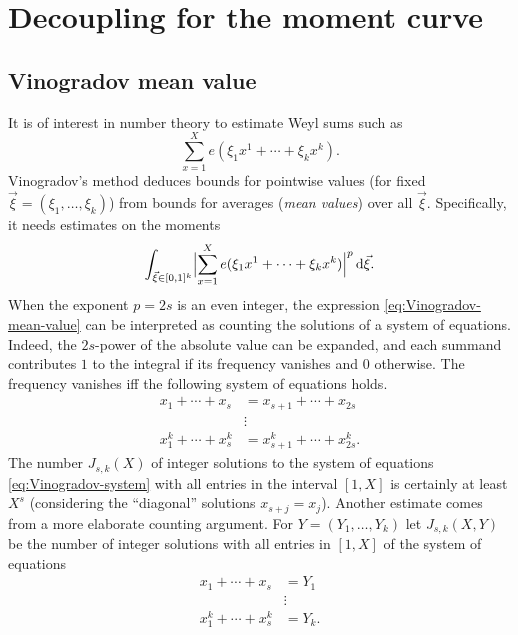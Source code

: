 \section{Decoupling for the moment curve}

\subsection{Vinogradov mean value}
It is of interest in number theory to estimate Weyl sums such as
\[
\sum_{x=1}^{X} e(\xi_{1} x^{1} + \dotsb + \xi_{k}x^{k} ).
\]
Vinogradov's method deduces bounds for pointwise values (for fixed $\vec\xi = (\xi_{1},\dotsc,\xi_{k})$) from bounds for averages (\emph{mean values}) over all $\vec\xi$.
Specifically, it needs estimates on the moments
\begin{equation}
\label{eq:Vinogradov-mean-value}
\int_{\vec\xi \in [0,1]^{k}} \abs[\Big]{ \sum_{x=1}^{X} e(\xi_{1} x^{1} + \dotsb + \xi_{k}x^{k} ) }^{p} \dif\vec\xi.
\end{equation}
When the exponent $p=2s$ is an even integer, the expression \eqref{eq:Vinogradov-mean-value} can be interpreted as counting the solutions of a system of equations.
Indeed, the $2s$-power of the absolute value can be expanded, and each summand contributes $1$ to the integral if its frequency vanishes and $0$ otherwise.
The frequency vanishes iff the following system of equations holds.
\begin{equation}
\label{eq:Vinogradov-system}
\begin{split}
x_{1} + \dotsb + x_{s} &= x_{s+1} + \dotsb + x_{2s} \\
& \vdots \\
x_{1}^{k} + \dotsb + x_{s}^{k} &= x_{s+1}^{k} + \dotsb + x_{2s}^{k}.
\end{split}
\end{equation}
The number $J_{s,k}(X)$ of integer solutions to the system of equations \eqref{eq:Vinogradov-system} with all entries in the interval $[1,X]$ is certainly at least $X^{s}$ (considering the ``diagonal'' solutions $x_{s+j}=x_{j}$).
Another estimate comes from a more elaborate counting argument.
For $Y=(Y_{1},\dotsc,Y_{k})$ let $J_{s,k}(X,Y)$ be the number of integer solutions with all entries in $[1,X]$ of the system of equations
\begin{align*}
x_{1} + \dotsb + x_{s} &= Y_{1} \\
& \vdots \\
x_{1}^{k} + \dotsb + x_{s}^{k} &= Y_{k}.
\end{align*}
